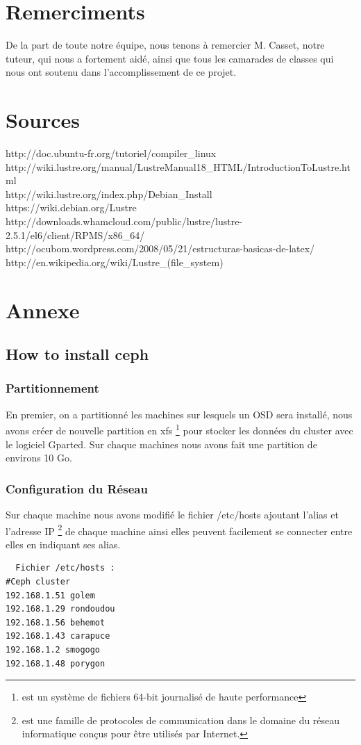 \documentclass[12pt]{article}
\begin{document}
\section{Remerciments}

De la part de toute notre équipe, nous tenons à remercier M. Casset, notre tuteur, qui nous a fortement aidé, ainsi que tous les camarades de classes qui nous ont soutenu dans l'accomplissement de ce projet.
\newpage
\section{Sources}
http://doc.ubuntu-fr.org/tutoriel/compiler\_linux \\
http://wiki.lustre.org/manual/LustreManual18\_HTML/IntroductionToLustre.html \\
http://wiki.lustre.org/index.php/Debian\_Install \\
https://wiki.debian.org/Lustre \\
http://downloads.whamcloud.com/public/lustre/lustre-2.5.1/el6/client/RPMS/x86\_64/ \\
http://ocubom.wordpress.com/2008/05/21/estructuras-basicas-de-latex/ \\
http://en.wikipedia.org/wiki/Lustre\_(file\_system) \\


\section{Annexe}
 
  \subsection{How to install ceph}
	\subsubsection{Partitionnement}
	En premier, on a partitionné les machines sur lesquels un OSD sera installé, nous avons créer de nouvelle partition en xfs \footnote{est un système de fichiers 64-bit journalisé de haute performance} pour stocker les données du cluster avec le logiciel Gparted. Sur chaque machines nous avons fait une partition de environs 10 Go.
	\subsubsection{Configuration du Réseau }
	Sur chaque machine nous avons modifié le fichier /etc/hosts ajoutant l'alias et l'adresse IP \footnote{est une famille de protocoles de communication dans le domaine du réseau informatique conçus pour être utilisés par Internet.} de chaque machine ainsi elles peuvent facilement se connecter entre elles en indiquant ses alias.
	\begin{verbatim}
  Fichier /etc/hosts :
#Ceph cluster
192.168.1.51 golem
192.168.1.29 rondoudou
192.168.1.56 behemot
192.168.1.43 carapuce
192.168.1.2 smogogo
192.168.1.48 porygon
	\end{verbatim}
\end{document}
